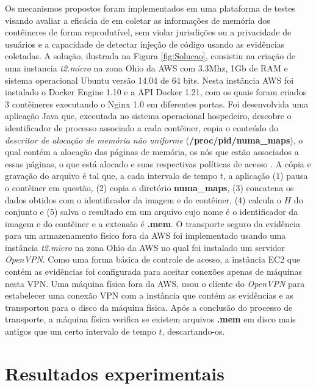 %
Os mecanismos propostos foram implementados em uma plataforma de testes visando avaliar a eficácia de \fancyname em coletar as informações de memória dos contêineres de forma reprodutível, sem violar jurisdições ou a privacidade de usuários e a capacidade de detectar injeção de código usando as evidências coletadas.
%
A solução, ilustrada na Figura \ref{fig:Solucao}, consistiu na criação de uma instancia \textit{t2.micro} na zona Ohio da AWS com 3.3Mhz, 1Gb de RAM e sistema operacional Ubuntu versão 14.04 de 64 bits. 
%
Nesta instância AWS foi instalado o Docker Engine 1.10 e a API Docker 1.21, com os quais foram criados 3 contêineres executando o Nginx 1.0 em diferentes portas. 
%
Foi desenvolvida uma aplicação Java que, executada no sistema operacional hospedeiro, descobre o identificador de processo associado a cada contêiner, copia o conteúdo do \textit{descritor de alocação de memória não uniforme} (\textbf{/proc/pid/numa\_maps}), o qual contém a alocação das páginas de memória, os nós que estão associados a essas páginas, o que está alocado e suas respectivas políticas de acesso \cite{UnixManPagesNumaMaps}.
%
A cópia e gravação do arquivo é tal que, a cada intervalo de tempo $t$, a aplicação (1) pausa o contêiner em questão, (2) copia a diretório \textbf{numa\_maps}, (3)  concatena os dados obtidos com o identificador da imagem e do contêiner, (4) calcula o $H$ do conjunto e (5) salva o resultado em um arquivo cujo nome é o identificador da imagem e do contêiner e a extensão é \textbf{.mem}. 
%
O transporte seguro da evidência para um armazenamento físico fora da AWS foi implementado usando uma instância \textit{t2.micro} na zona Ohio da AWS no qual foi instalado um servidor \textit{OpenVPN}.
%
Como uma forma básica de controle de acesso, a instância EC2 que contém as evidências foi configurada para aceitar conexões apenas de máquinas nesta VPN.
%
Uma máquina física fora da AWS, usou o cliente do \textit{OpenVPN} para estabelecer uma conexão VPN com a instância que contém as evidências e as transportou para o disco da máquina física.
%
Após a conclusão do processo de transporte, a máquina física verifica se existem arquivos \textbf{.mem} em disco mais antigos que um certo intervalo de tempo $t$, descartando-os.
%


\section{Resultados experimentais}
\label{sec:proposta-exp}

